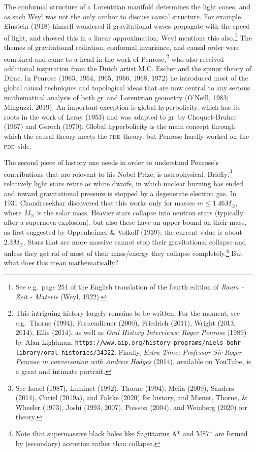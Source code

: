 \documentclass[11pt,a4paper]{article}
\newcommand{\pde}{\textsc{pde}}
\newcommand{\GR}{{\sc gr}}
\begin{document}
The conformal structure of a Lorentzian manifold determines the light cones, and as such
 Weyl was not the only author to discuss causal structure. For example, Einstein (1918) himself wondered if gravitational waves propagate with the speed of light, and showed this in a linear approximation; Weyl mentions this also.\footnote{See e.g.\ page 251 of the English translation of the fourth edition of  \emph{Raum - Zeit - Materie} (Weyl, 1922).} 
The themes of gravitational radiation, conformal invariance,  and causal order were combined and came to a head in the work of Penrose,\footnote{This intriguing history largely remains to be written. For the moment, see e.g.\ Thorne (1994), Frauendiener  (2000), Friedrich (2011),  Wright (2013, 2014), Ellis (2014), as well as \emph{Oral History Interviews: Roger Penrose} (1989) by Alan Lightman, \texttt{https://www.aip.org/history-programs/niels-bohr-library/oral-histories/34322}. Finally,
\emph{Extra Time: Professor Sir Roger Penrose in conversation with Andrew Hodges} (2014), available on YouTube, is a great and intimate portrait.
 } who also received additional inspiration from the Dutch artist M.C. Escher and the spinor theory of Dirac.
 In Penrose (1963, 1964, 1965, 1966, 1968, 1972) he introduced most of the global causal techniques and topological ideas   that are now central to any serious mathematical analysis of both \GR\ and Lorentzian geometry (O'Neill, 1983; Minguzzi, 2019). An important exception is global hyperbolicity, which has its roots in the work of Leray (1953) and was adapted to \GR\ by Choquet-Bruhat (1967) and Geroch (1970). Global hyperbolicity is the main concept through which the causal theory meets the \pde\ theory, but Penrose  hardly worked on the \pde\ side. 

The second piece of history one needs in order to understand Penrose's  contributions that are relevant to his Nobel Prize, is astrophysical. Briefly:\footnote{See  Israel (1987), Luminet (1992), Thorne (1994),  Melia (2009),  Sanders (2014), 
Curiel (2019a), and Falcke (2020)  for history, 
and Misner, Thorne, \& Wheeler (1973), Joshi (1993, 2007),   Poisson (2004), and  Weinberg (2020) for theory.} relatively light stars retire as white dwarfs, in which nuclear burning has ended and inward gravitational pressure is stopped by a degenerate electron gas. In 1931 Chandrasekhar  discovered that this works only for masses $m\leq 1.46 M_{\odot}$, where $M_{\odot}$ is the solar mass. Heavier stars collapse into neutron stars (typically after a supernova explosion), but also these have an upper bound on their mass, as first suggested by Oppenheimer \& Volkoff (1939); the current value is about $2.3  M_{\odot}$.  Stars that are more massive cannot stop their gravitational collapse and unless they get rid of most of their mass/energy they collapse completely.\footnote{Note that supermassive black holes like Sagittarius A* and M87* are formed by (secondary) accretion rather than collapse.}
 But what  does this mean mathematically?
\end{document}
